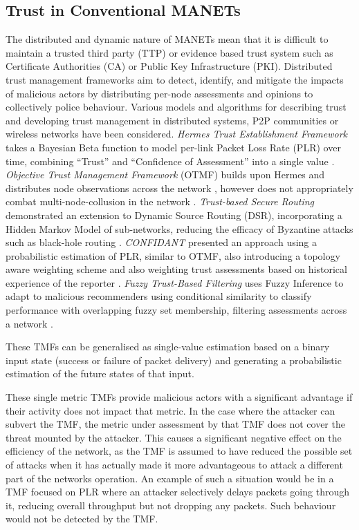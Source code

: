 \subsection{Trust in Conventional MANETs}\label{sec:trustinmanets}

The distributed and dynamic nature of MANETs mean that it is difficult to maintain a trusted third party (TTP) or evidence based trust system such as Certificate Authorities (CA) or Public Key Infrastructure (PKI).
Distributed trust management frameworks aim to detect, identify, and mitigate the impacts of malicious actors by distributing per-node assessments and opinions to collectively police behaviour.
Various models and algorithms for describing trust and developing trust management in distributed systems, P2P communities or wireless networks have been considered.
\emph{Hermes Trust Establishment Framework} takes a Bayesian Beta function to model per-link Packet Loss Rate (PLR) over time, combining ``Trust'' and ``Confidence of Assessment'' into a single value \cite{Zouridaki2005}.
\emph{Objective Trust Management Framework} (OTMF) builds upon Hermes and distributes node observations across the network \cite{Li2008}, however does not appropriately combat multi-node-collusion in the network \cite{Cho2011}.
\emph{Trust-based Secure Routing} demonstrated an extension to Dynamic Source Routing (DSR), incorporating a Hidden Markov Model of sub-networks, reducing the efficacy of Byzantine attacks such as black-hole routing  \cite{Moe2008a}.
\emph{CONFIDANT} presented an approach using a probabilistic estimation of PLR, similar to OTMF, also introducing a topology aware weighting scheme and also weighting trust assessments based on historical experience of the reporter \cite{Buchegger2002}.
\emph{Fuzzy Trust-Based Filtering} uses Fuzzy Inference to adapt to malicious recommenders using conditional similarity to classify performance with overlapping fuzzy set membership, filtering assessments across a network \cite{Luo2008}. 

These TMFs can be generalised as single-value estimation based on a binary input state (success or failure of packet delivery) and generating a probabilistic estimation of the future states of that input. 

These single metric TMFs provide malicious actors with a significant advantage if their activity does not impact that metric.
In the case where the attacker can subvert the TMF, the metric under assessment by that TMF does not cover the threat mounted by the attacker.
This causes a significant negative effect on the efficiency of the network, as the TMF is assumed to have reduced the possible set of attacks when it has actually made it more advantageous to attack a different part of the networks operation.
An example of such a situation would be in a TMF focused on PLR where an attacker selectively delays packets going through it, reducing overall throughput but not dropping any packets.
Such behaviour would not be detected by the TMF.

